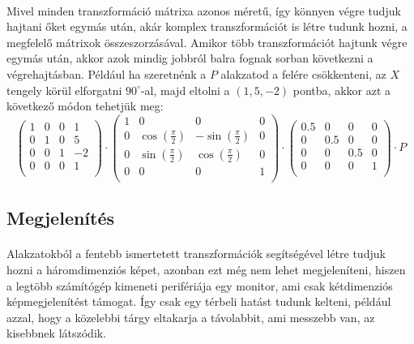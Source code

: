 \documentclass[12pt]{report}
\begin{document}
\paragraph{}
Mivel minden transzformáció mátrixa azonos méretű, így könnyen végre tudjuk hajtani őket egymás után, akár komplex transzformációt is létre tudunk hozni, a megfelelő mátrixok összeszorzásával. Amikor több transzformációt hajtunk végre egymás után, akkor azok mindig jobbról balra fognak sorban következni a végrehajtásban. Például ha szeretnénk a $P$ alakzatod a felére csökkenteni, az $X$ tengely körül elforgatni $90^{\circ}$-al, majd eltolni a $(1,5,-2)$ pontba, akkor azt a következő módon tehetjük meg:
$$
\left( \begin{array}{cccc}
	1 & 0 & 0 & 1 \\
	0 & 1 & 0 & 5 \\
	0 & 0 & 1 & -2 \\
	0 & 0 & 0 & 1 \\
\end{array} \right)
\cdot
\left( \begin{array}{cccc}
	1 & 0 & 0 & 0 \\
	0 & \cos(\frac{\pi}{2}) & -\sin(\frac{\pi}{2}) & 0 \\
	0 & \sin(\frac{\pi}{2}) & \cos(\frac{\pi}{2}) & 0 \\
	0 & 0 & 0 & 1 \\
\end{array} \right)
\cdot
\left( \begin{array}{cccc}
	0.5 & 0 & 0 & 0 \\
	0 & 0.5 & 0 & 0 \\
	0 & 0 & 0.5 & 0 \\
	0 & 0 & 0 & 1 \\
\end{array} \right)
\cdot
P
$$

\subsection{Megjelenítés}
\paragraph{}
Alakzatokból a fentebb ismertetett transzformációk segítségével létre tudjuk hozni a háromdimenziós képet, azonban ezt még nem lehet megjeleníteni, hiszen a legtöbb számítógép kimeneti perifériája egy monitor, ami csak kétdimenziós képmegjelenítést támogat. Így csak egy térbeli hatást tudunk kelteni, például azzal, hogy a közelebbi tárgy eltakarja a távolabbit, ami messzebb van, az kisebbnek látszódik.
\end{document}
